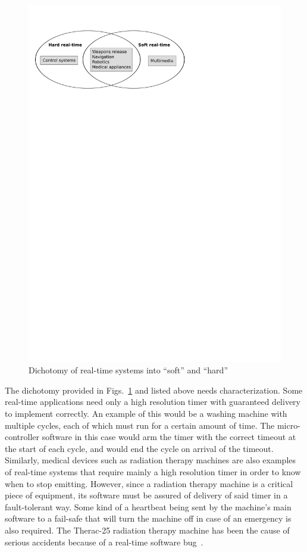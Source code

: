 \begin{figure}
\centering
\includegraphics[scale=0.75]{figs/rt_apps_overview}
\caption{Dichotomy of real-time systems into ``soft'' and
  ``hard''}
\label{fig:rt_apps_overview}
\end{figure}

The dichotomy provided in Figs.~\ref{fig:rt_apps_overview} and listed
above needs characterization. Some real-time applications need only a
high resolution timer with guaranteed delivery to implement
correctly. An example of this would be a washing machine with multiple
cycles, each of which must run for a certain amount of time. The
micro-controller software in this case would arm the timer with the
correct timeout at the start of each cycle, and would end the cycle on
arrival of the timeout. Similarly, medical devices such as radiation
therapy machines are also examples of real-time systems that require
mainly a high resolution timer in order to know when to stop
emitting. However, since a radiation therapy machine is a critical
piece of equipment, its software must be assured of delivery of said
timer in a fault-tolerant way. Some kind of a heartbeat being sent by
the machine's main software to a fail-safe that will turn the machine
off in case of an emergency is also required. The Therac-25 radiation
therapy machine has been the cause of serious accidents because of a
real-time software bug~\cite{leveson@computer93}.

